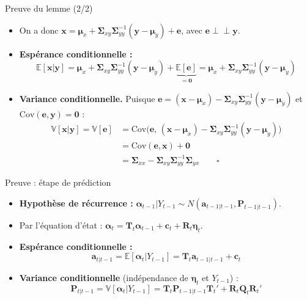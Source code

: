 \documentclass[11pt,aspectratio=169]{beamer}
\newcommand{\E}{\mathbb{E}}
\newcommand{\Var}{\mathbb{V}}
\newcommand{\Cov}{\mathrm{Cov}}
\begin{document}
\begin{frame}{Preuve du lemme (2/2)}

\begin{itemize}

\item On a donc $\bm{x} = \bm{\mu}_x + \bm{\Sigma}_{xy} \bm{\Sigma}_{yy}^{-1} (\bm{y} - \bm{\mu}_y) + \bm{e}$, avec $\bm{e} \perp\!\!\!\perp \bm{y}$.\newline

\item \textbf{Espérance conditionnelle :}
  \[
  \E[\bm{x} | \bm{y}] = \bm{\mu}_x + \bm{\Sigma}_{xy} \bm{\Sigma}_{yy}^{-1} (\bm{y} - \bm{\mu}_y) + \underbrace{\E[\bm{e}]}_{= \bm{0}} = \bm{\mu}_x + \bm{\Sigma}_{xy} \bm{\Sigma}_{yy}^{-1} (\bm{y} - \bm{\mu}_y)
  \]\newline

\item \textbf{Variance conditionnelle.} Puisque $\bm{e} = (\bm{x} - \bm{\mu}_x) - \bm{\Sigma}_{xy}\bm{\Sigma}_{yy}^{-1}(\bm{y} - \bm{\mu}_y)$ et $\Cov(\bm{e}, \bm{y}) = \bm{0}$ :
  \begin{align*}
  \Var[\bm{x} | \bm{y}] = \Var[\bm{e}] &= \Cov\!\big(\bm{e},\, (\bm{x}{-}\bm{\mu}_x) - \bm{\Sigma}_{xy}\bm{\Sigma}_{yy}^{-1}(\bm{y}{-}\bm{\mu}_y)\big) \\
  &= \Cov(\bm{e}, \bm{x}) + \bm{0} \\
  &= \bm{\Sigma}_{xx} - \bm{\Sigma}_{xy} \bm{\Sigma}_{yy}^{-1} \bm{\Sigma}_{yx} \qquad \square
  \end{align*}

\end{itemize}

\end{frame}

\begin{frame}{Preuve : étape de prédiction}

\begin{itemize}

\item \textbf{Hypothèse de récurrence :} $\bm{\alpha}_{t-1} | Y_{t-1} \sim N(\bm{a}_{t-1|t-1}, \bm{P}_{t-1|t-1})$.\newline

\item Par l'équation d'état : $\bm{\alpha}_t = \bm{T}_t \bm{\alpha}_{t-1} + \bm{c}_t + \bm{R}_t \bm{\eta}_t$.\newline

\item \textbf{Espérance conditionnelle :}
  \[
  \bm{a}_{t|t-1} = \E[\bm{\alpha}_t | Y_{t-1}] = \bm{T}_t \bm{a}_{t-1|t-1} + \bm{c}_t
  \]\newline

\item \textbf{Variance conditionnelle} (indépendance de $\bm{\eta}_t$ et $Y_{t-1}$) :
  \[
  \bm{P}_{t|t-1} = \Var[\bm{\alpha}_t | Y_{t-1}] = \bm{T}_t \bm{P}_{t-1|t-1} \bm{T}_t' + \bm{R}_t \bm{Q}_t \bm{R}_t'
  \]

\end{itemize}

\end{frame}
\end{document}
